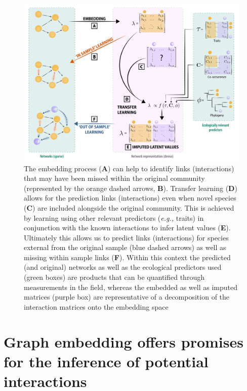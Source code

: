 \begin{refsection}
\begin{figure}[h]
    \centering
    \includegraphics[width=\textwidth]{figures/conceptual_2.png}
    \caption{The embedding process (\textbf{A}) can help to identify links
(interactions) that may have been missed within the original community
(represented by the orange dashed arrows, \textbf{B}). Transfer learning
(\textbf{D}) allows for the prediction links (interactions) even when
novel species (\textbf{C}) are included alongside the original
community. This is achieved by learning using other relevant predictors
(\emph{e.g.,} traits) in conjunction with the known interactions to infer
latent values (\textbf{E}). Ultimately this allows us to predict links
(interactions) for species external from the original sample (blue
dashed arrows) as well as missing within sample links (\textbf{F}).
Within this context the predicted (and original) networks as well as the
ecological predictors used (green boxes) are products that can be
quantified through measurements in the field, whereas the embedded as
well as imputed matrices (purple box) are representative of a
decomposition of the interaction matrices onto the embedding
space}
    \label{fig:embedding}
\end{figure}

\section{Graph embedding offers promises for the inference of potential
interactions}\label{graph-embedding-offers-promises-for-the-inference-of-potential-interactions}


\end{refsection}
